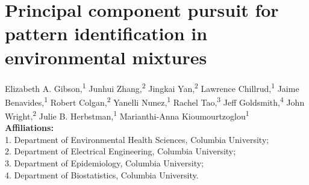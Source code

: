 \chapter[Principal component pursuit]{Principal component pursuit for pattern identification in environmental mixtures}\label{sec:ch2}
\vspace{-3em}

\begin{center}
Elizabeth A. Gibson,\textsuperscript{1} 
Junhui Zhang,\textsuperscript{2} 
Jingkai Yan,\textsuperscript{2}
Lawrence Chillrud,\textsuperscript{1} 
Jaime Benavides,\textsuperscript{1} 
Robert Colgan,\textsuperscript{2} 
Yanelli Nunez,\textsuperscript{1} 
Rachel Tao,\textsuperscript{3} 
Jeff Goldsmith,\textsuperscript{4} 
John Wright,\textsuperscript{2} 
Julie B. Herbstman,\textsuperscript{1} 
Marianthi-Anna Kioumourtzoglou\textsuperscript{1} \\ 

\textbf{Affiliations:} \\ 
1. Department of Environmental Health Sciences, Columbia University; \\ 
2. Department of Electrical Engineering, Columbia University; \\ 
3. Department of Epidemiology, Columbia University; \\
4. Department of Biostatistics, Columbia University. \\ 
\end{center}

\clearpage

